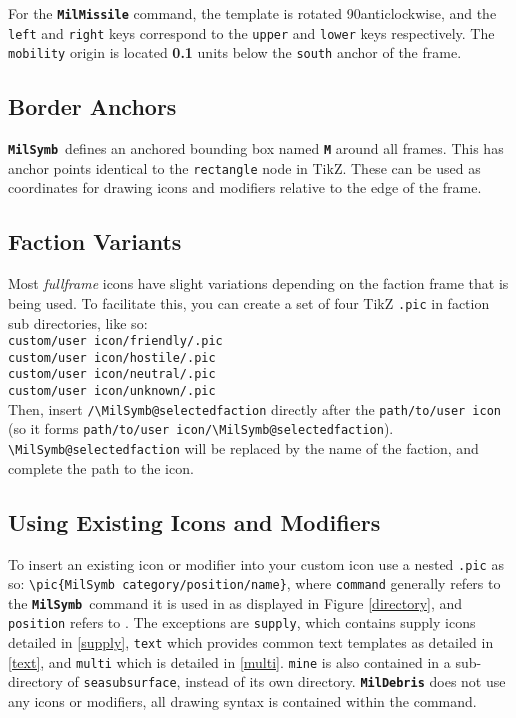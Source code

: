 \documentclass[a4paper, titlepage]{article}
\newcommand\MilSymb{\textbf{\texttt{MilSymb}}}
\begin{document}
For the \texttt{\textbf{MilMissile}} command, the template is rotated 90\textdegree anticlockwise, and the \texttt{left} and \texttt{right} keys correspond to the \texttt{upper} and \texttt{lower} keys respectively. The \texttt{mobility} origin is located \textbf{0.1} units below the \texttt{south} anchor of the frame.

\subsection{Border Anchors}

\MilSymb\  defines an anchored bounding box named \textbf{\texttt{M}} around all frames. This has anchor points identical to the \texttt{rectangle} node in TikZ. These can be used as coordinates for drawing icons and modifiers relative to the edge of the frame.

\subsection{Faction Variants}

Most \textit{fullframe} icons have slight variations depending on the faction frame that is being used. To facilitate this, you can create a set of four TikZ \texttt{.pic} in faction sub directories, like so:\\

\noindent\texttt{custom/user icon/friendly/.pic}\\
\texttt{custom/user icon/hostile/.pic}\\
\texttt{custom/user icon/neutral/.pic}\\
\texttt{custom/user icon/unknown/.pic}\\

Then, insert \texttt{/\textbackslash MilSymb@selectedfaction} directly after the \texttt{path/to/user icon} (so it forms \texttt{path/to/user icon/\textbackslash MilSymb@selectedfaction}). \texttt{\textbackslash MilSymb@selectedfaction} will be replaced by the name of the faction, and complete the path to the icon.

\subsection{Using Existing Icons and Modifiers}

To insert an existing icon or modifier into your custom icon use a nested \texttt{.pic} as so: \texttt{\textbackslash pic\{MilSymb category/position/name\}}, where \texttt{command} generally refers to the \MilSymb\  command it is used in as displayed in Figure \ref{directory}, and \texttt{position} refers to . The exceptions are \texttt{supply}, which contains supply icons detailed in \ref{supply}, \texttt{text} which provides common text templates as detailed in \ref{text}, and \texttt{multi} which is detailed in \ref{multi}. \texttt{mine} is also contained in a sub-directory of \texttt{seasubsurface}, instead of its own directory. \texttt{\textbf{MilDebris}} does not use any icons or modifiers, all drawing syntax is contained within the command.
\end{document}
